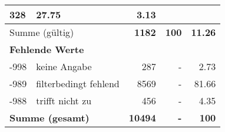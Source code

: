 \begin{longtable}{lXrrr}
       \num{328} &
       \num[round-mode=places,round-precision=2]{27.75} &
         \num[round-mode=places,round-precision=2]{3.13} \\
     \midrule
     \multicolumn{2}{l}{Summe (gültig)} &
       \textbf{\num{1182}} &
     \textbf{\num{100}} &
       \textbf{\num[round-mode=places,round-precision=2]{11.26}} \\
     \multicolumn{5}{l}{\textbf{Fehlende Werte}}\\
       -998 &
       keine Angabe &
         \num{287} &
        - &
         \num[round-mode=places,round-precision=2]{2.73} \\
       -989 &
       filterbedingt fehlend &
         \num{8569} &
        - &
         \num[round-mode=places,round-precision=2]{81.66} \\
       -988 &
       trifft nicht zu &
         \num{456} &
        - &
         \num[round-mode=places,round-precision=2]{4.35} \\
     \midrule
     \multicolumn{2}{l}{\textbf{Summe (gesamt)}} &
          \textbf{\num{10494}} &
        \textbf{-} &
        \textbf{\num{100}} \\
     \bottomrule
     \end{longtable}
     

